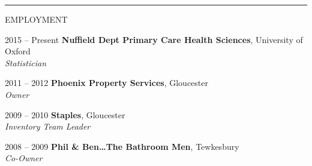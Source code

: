 \documentclass[10pt,a4paper]{article}
\begin{document}
\noindent\rule{\textwidth}{0.4pt}
\begin{cvlist}{EMPLOYMENT}
  
  \item[2015 -- Present]
  \textbf{Nuffield Dept Primary Care Health Sciences}, University of Oxford \\
  \textit{Statistician}
  
  \item[2011 -- 2012]
  \textbf{Phoenix Property Services}, Gloucester \\
  \textit{Owner}
  
  \item[2009 -- 2010]
  \textbf{Staples}, Gloucester \\
  \textit{Inventory Team Leader}
  
  \item[2008 -- 2009]
  \textbf{Phil \& Ben\ldots The Bathroom Men}, Tewkesbury \\
  \textit{Co-Owner}
  
\end{cvlist}
\end{document}
